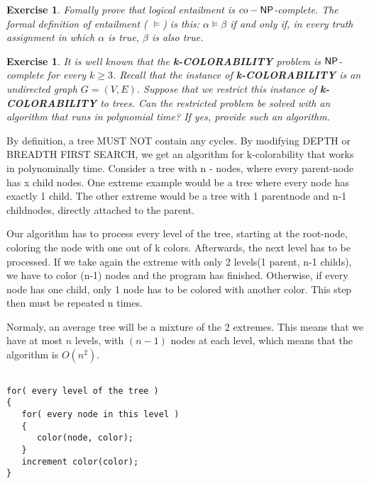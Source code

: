 \documentclass [11pt]{article}
\newenvironment{mylisting}
{\begin{list}{}{\setlength{\leftmargin}{1em}}\item\scriptsize\bfseries}
{\end{list}}
\newtheorem{exercise}[theorem]{Exercise}
\newcommand{\ccfont}[1]{\protect\mathsf{#1}}
\newcommand{\NP}{\ccfont{NP}}
\newcommand{\solution}[1]{\noindent {\bf Solution.}  #1}
\begin{document}


\begin{exercise}
  \label{ex:CO-NP}
  Fomally prove that logical entailment is $co-\NP$-complete. The formal definition of entailment ( $\models$) is this: $\alpha \models \beta$ if and only if, in every truth assignment in which $\alpha$ is true, $\beta$ is also true.  
\end{exercise}





\begin{exercise}
  \label{ex:Colors}
  It is well known that the \textbf{k-COLORABILITY} problem is $\NP$-complete for every $k \geq 3$. Recall that the instance of \textbf{k-COLORABILITY} is an undirected graph $G = (V, E)$. Suppose that we restrict this instance of \textbf{k-COLORABILITY} to trees. Can the restricted problem be solved with an algorithm that runs in polynomial time? If yes, provide such an algorithm. 
\end{exercise}


\solution

By definition, a tree MUST NOT contain any cycles. By modifying DEPTH or BREADTH FIRST SEARCH, we get an algorithm for k-colorability that works in polynominally time. Consider a tree with n - nodes, where every parent-node has x child nodes. One extreme example would be a tree where every node has exactly 1 child. The other extreme would be a tree with 1 parentnode and n-1 childnodes, directly attached to the parent.

Our algorithm has to process every level of the tree, starting at the root-node, coloring the node with one out of k colors. Afterwards, the next level has to be processed. If we take again the extreme with only 2 levels(1 parent, n-1 childs), we have to color (n-1) nodes and the program has finished. Otherwise, if every node has one child, only 1 node has to be colored with another color. This step then must be repeated n times.

Normaly, an average tree will be a mixture of the 2 extremes. This means that we have at most $n$ levels, with $(n-1)$ nodes at each level, which means that the algorithm is $O(n^2)$.  

\begin{mylisting}
\begin{verbatim}

for( every level of the tree )
{
   for( every node in this level )
   {
      color(node, color);
   }
   increment color(color);
}

\end{verbatim}
\end{mylisting}
\end{document}
